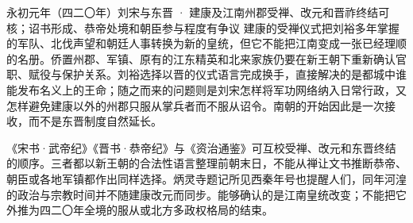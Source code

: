 \begin{event}{}{永初元年（四二〇年）}{刘宋与东晋 · 建康及江南州郡}{受禅、改元和晋祚终结可核；诏书形成、恭帝处境和朝臣参与程度有争议}
建康的受禅仪式把刘裕多年掌握的军队、北伐声望和朝廷人事转换为新的皇统，但它不能把江南变成一张已经理顺的名册。侨置州郡、军镇、原有的江东精英和北来家族仍要在新王朝下重新确认官职、赋役与保护关系。刘裕选择以晋的仪式语言完成换手，直接解决的是都城中谁能发布名义上的王命；随之而来的问题则是刘宋怎样将军功网络纳入日常行政，又怎样避免建康以外的州郡只服从掌兵者而不服从诏令。南朝的开始因此是一次接收，而不是东晋制度自然延长。

《宋书·武帝纪》《晋书·恭帝纪》与《资治通鉴》可互校受禅、改元和东晋终结的顺序。三者都以新王朝的合法性语言整理前朝末日，不能从禅让文书推断恭帝、朝臣或各地军镇都作出同样选择。炳灵寺题记所见西秦年号也提醒人们，同年河湟的政治与宗教时间并不随建康改元而同步。能够确认的是江南皇统改变；不能把它外推为四二〇年全境的服从或北方多政权格局的结束。
\end{event}